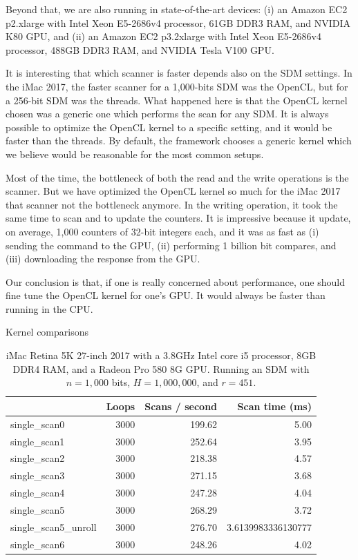 Beyond that, we are also running in state-of-the-art devices: (i) an Amazon EC2 p2.xlarge with Intel Xeon E5-2686v4 processor, 61GB DDR3 RAM, and NVIDIA K80 GPU, and (ii) an Amazon EC2 p3.2xlarge with Intel Xeon E5-2686v4 processor, 488GB DDR3 RAM, and NVIDIA Tesla V100 GPU.

It is interesting that which scanner is faster depends also on the SDM settings. In the iMac 2017, the faster scanner for a 1,000-bits SDM was the OpenCL, but for a 256-bit SDM was the threads. What happened here is that the OpenCL kernel chosen was a generic one which performs the scan for any SDM. It is always possible to optimize the OpenCL kernel to a specific setting, and it would be faster than the threads. By default, the framework chooses a generic kernel which we believe would be reasonable for the most common setups.

Most of the time, the bottleneck of both the read and the write operations is the scanner. But we have optimized the OpenCL kernel so much for the iMac 2017 that scanner not the bottleneck anymore. In the writing operation, it took the same time to scan and to update the counters. It is impressive because it update, on average, 1,000 counters of 32-bit integers each, and it was as fast as (i) sending the command to the GPU, (ii) performing 1 billion bit compares, and (iii) downloading the response from the GPU.

Our conclusion is that, if one is really concerned about performance, one should fine tune the OpenCL kernel for one's GPU. It would always be faster than running in the CPU.


Kernel comparisons

\begin{table}[!htb]
\centering
\begin{tabular}{| l | r | r | r |}
    \hline
    & Loops & Scans / second & Scan time (ms) \\ \hline
    single\_scan0 & 3000 & 199.62 & 5.00 \\
    single\_scan1 & 3000 & 252.64 & 3.95 \\
    single\_scan2 & 3000 & 218.38 & 4.57 \\
    single\_scan3 & 3000 & 271.15 & 3.68 \\
    single\_scan4 & 3000 & 247.28 & 4.04 \\
    single\_scan5 & 3000 & 268.29 & 3.72 \\
    single\_scan5\_unroll & 3000 & 276.70 & 3.6139983336130777 \\
    single\_scan6 & 3000 & 248.26 & 4.02 \\
    \hline
\end{tabular}
\caption{iMac Retina 5K 27-inch 2017 with a 3.8GHz Intel core i5 processor, 8GB DDR4 RAM, and a Radeon Pro 580 8G GPU. Running an SDM with $n=1,000$ bits, $H=1,000,000$, and $r=451$.
\label{tab:perf-imac-256}}
\end{table}

